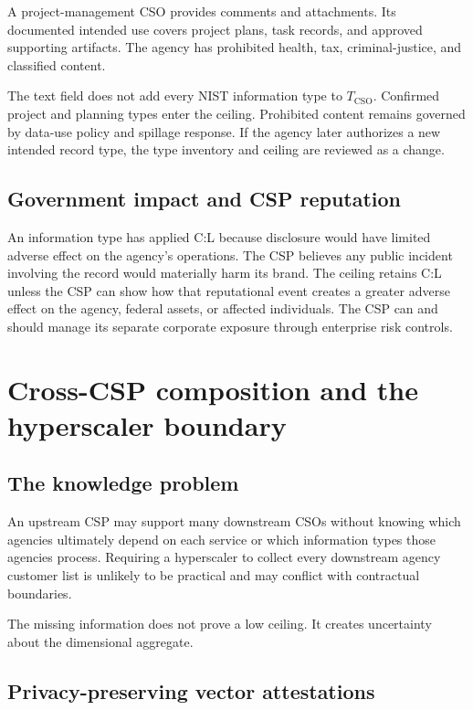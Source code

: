 \documentclass[11pt]{article}
\begin{document}
A project-management CSO provides comments and attachments. Its documented
intended use covers project plans, task records, and approved supporting artifacts.
The agency has prohibited health, tax, criminal-justice, and classified content.

The text field does not add every NIST information type to
$T_{\mathrm{CSO}}$. Confirmed project and planning types enter the ceiling.
Prohibited content remains governed by data-use policy and spillage response.
If the agency later authorizes a new intended record type, the type inventory and
ceiling are reviewed as a change.

\subsection{Government impact and CSP reputation}

An information type has applied C:L because disclosure would have limited adverse
effect on the agency's operations. The CSP believes any public incident involving
the record would materially harm its brand. The ceiling retains C:L unless the CSP
can show how that reputational event creates a greater adverse effect on the agency,
federal assets, or affected individuals. The CSP can and should manage its separate
corporate exposure through enterprise risk controls.

\section{Cross-CSP composition and the hyperscaler boundary}

\subsection{The knowledge problem}

An upstream CSP may support many downstream CSOs without knowing which agencies
ultimately depend on each service or which information types those agencies process.
Requiring a hyperscaler to collect every downstream agency customer list is
unlikely to be practical and may conflict with contractual boundaries.

The missing information does not prove a low ceiling. It creates uncertainty about
the dimensional aggregate.

\subsection{Privacy-preserving vector attestations}
\end{document}
